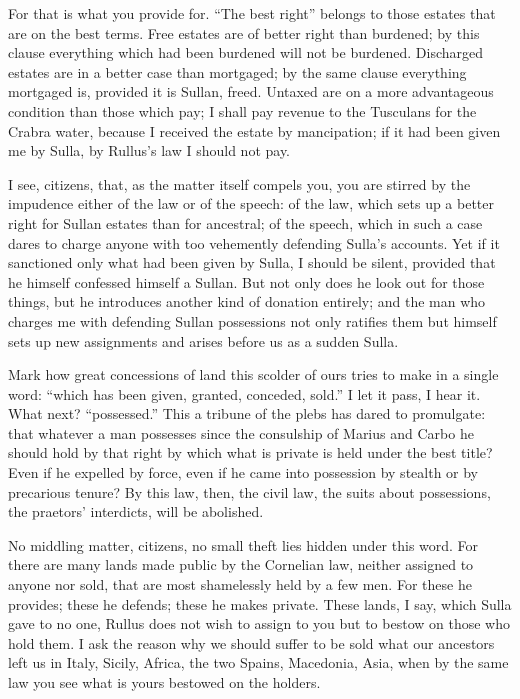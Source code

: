  For that is what you provide for. ``The best right'' belongs to those estates that are on the best terms. Free estates are of better right than burdened; by this clause everything which had been burdened will not be burdened. Discharged estates are in a better case than mortgaged; by the same clause everything mortgaged is, provided it is Sullan, freed. Untaxed are on a more advantageous condition than those which pay; I shall pay revenue to the Tusculans for the Crabra water, because I received the estate by mancipation; if it had been given me by Sulla, by Rullus's law I should not pay.

 I see, citizens, that, as the matter itself compels you, you are stirred by the impudence either of the law or of the speech: of the law, which sets up a better right for Sullan estates than for ancestral; of the speech, which in such a case dares to charge anyone with too vehemently defending Sulla's accounts. Yet if it sanctioned only what had been given by Sulla, I should be silent, provided that he himself confessed himself a Sullan. But not only does he look out for those things, but he introduces another kind of donation entirely; and the man who charges me with defending Sullan possessions not only ratifies them but himself sets up new assignments and arises before us as a sudden Sulla.

 Mark how great concessions of land this scolder of ours tries to make in a single word: ``which has been given, granted, conceded, sold.'' I let it pass, I hear it. What next? ``possessed.'' This a tribune of the plebs has dared to promulgate: that whatever a man possesses since the consulship of Marius and Carbo he should hold by that right by which what is private is held under the best title? Even if he expelled by force, even if he came into possession by stealth or by precarious tenure? By this law, then, the civil law, the suits about possessions, the praetors' interdicts, will be abolished.

 No middling matter, citizens, no small theft lies hidden under this word. For there are many lands made public by the Cornelian law, neither assigned to anyone nor sold, that are most shamelessly held by a few men. For these he provides; these he defends; these he makes private. These lands, I say, which Sulla gave to no one, Rullus does not wish to assign to you but to bestow on those who hold them. I ask the reason why we should suffer to be sold what our ancestors left us in Italy, Sicily, Africa, the two Spains, Macedonia, Asia, when by the same law you see what is yours bestowed on the holders.

